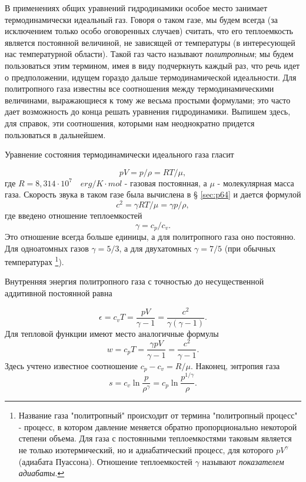 В применениях общих уравнений гидродинамики особое место занимает термодинамически идеальный газ.
Говоря о таком газе, мы будем всегда (за исключением только особо оговоренных случаев) считать, что его теплоемкость является постоянной величиной, не зависящей от температуры (в интересующей нас температурной области).
Такой газ часто называют \emph{политропным}; мы будем пользоваться этим термином, имея в виду подчеркнуть каждый раз, что речь идет о предположении, идущем гораздо дальше термодинамической идеальности.
Для политропного газа известны все соотношения между термодинамическими величинами, выражающиеся к тому же весьма простыми формулами; это часто дает возможность до конца решать уравнения гидродинамики.
Выпишем здесь, для справок, эти соотношения, которыми нам неоднократно придется пользоваться в дальнейшем.


Уравнение состояния термодинамически идеального газа гласит

\begin{equation}
    \label{eq:83.8}
    pV = p/\rho = RT/\mu,
\end{equation}
где $R = 8,314 \cdot 10^7\quad erg/K\cdot mol$  - газовая постоянная, а $\mu$  - молекулярная масса газа.
Скорость звука в таком газе была вычислена в § \ref{sec:p64} и дается формулой
\begin{equation}
    \label{eq:83.9}
    c^2 = \gamma RT/\mu = \gamma p/\rho,
\end{equation}
где введено отношение теплоемкостей
\[
    \gamma = c_p/c_v.
\]
Это отношение всегда больше единицы, а для политропного газа оно постоянно.
Для одноатомных газов $\gamma = 5/3$, а для двухатомных $\gamma = 7/5$ (при обычных температурах
\footnote{Название газа "политропный" происходит от термина "политропный процесс" - процесс, в котором давление меняется обратно пропорционально некоторой степени объема.
Для газа с постоянными теплоемкостями таковым является не только изотермический, но и адиабатический процесс, для которого $pV^{\gamma}$ (адиабата Пуассона).
Отношение теплоемкостей $\gamma$ называют \emph{показателем адиабаты}.}).

Внутренняя энергия политропного газа с точностью до несущественной аддитивной постоянной равна

\begin{equation}
    \label{eq:83.10}
    \epsilon = c_v T = \frac{pV}{\gamma - 1} = \frac{c^2}{\gamma(\gamma - 1)}.
\end{equation}
Для тепловой функции имеют место аналогичные формулы
\begin{equation}
    \label{eq:83.11}
    w = c_p T = \frac{\gamma pV}{\gamma - 1} = \frac{c^2}{\gamma - 1}.
\end{equation}
Здесь учтено известное соотношение $c_p - c_v = R/\mu$. Наконец, энтропия газа
\begin{equation}
    \label{eq:83.12}
    s = c_v \ln \frac{p}{\rho^\gamma} = c_p \ln \frac{p^{1/\gamma}}{\rho}.
\end{equation}

